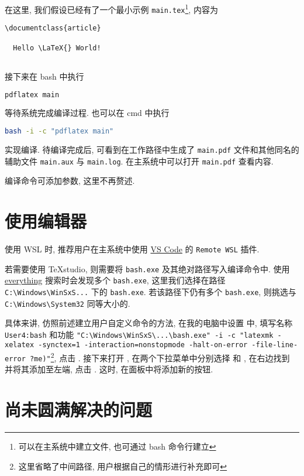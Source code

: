 在这里, 我们假设已经有了一个最小示例 \texttt{main.tex}\footnote{可以在主系统中建立文件, 也可通过 \textsf{bash} 命令行建立},
内容为
\begin{lstlisting}[language = {[LaTeX]TeX}]
  \documentclass{article}
  
  Hello \LaTeX{} World!
  
\end{lstlisting}
接下来在 \textsf{bash} 中执行
\begin{lstlisting}[language=bash]
  pdflatex main
\end{lstlisting}
等待系统完成编译过程. 
也可以在 \textsf{cmd} 中执行
\begin{lstlisting}[language=bash]
  bash -i -c "pdflatex main"
\end{lstlisting}
实现编译.
待编译完成后, 可看到在工作路径中生成了 \texttt{main.pdf} 文件和其他同名的辅助文件 \texttt{main.aux} 与 \texttt{main.log}.
在主系统中可以打开 \texttt{main.pdf} 查看内容.

编译命令可添加参数, 这里不再赘述.

\section{使用编辑器}

使用 WSL 时,
推荐用户在主系统中使用 \href{https://code.visualstudio.com/}{VS Code} 的 \texttt{Remote WSL} 插件.

若需要使用 \TeX studio, 则需要将 \texttt{bash.exe} 及其绝对路径写入编译命令中.
使用 \href{https://www.voidtools.com/zh-cn/}{everything} 搜索时会发现多个 \texttt{bash.exe}, 这里我们选择在路径 \texttt{C:\textbackslash Windows\textbackslash WinSxS...} 下的 \texttt{bash.exe}.
若该路径下仍有多个 \texttt{bash.exe}, 则挑选与 \texttt{C:\textbackslash Windows\textbackslash System32} 同等大小的.

具体来讲, 仿照前述建立用户自定义命令的方法,
在我的电脑中设置  中, 填写名称 \texttt{User4:bash} 和功能 \texttt{"C:\textbackslash Windows\textbackslash WinSxS\textbackslash...\textbackslash bash.exe" -i -c "latexmk -xelatex -synctex=1 -interaction=nonstopmode -halt-on-error -file-line-error ?me)"}\footnote{这里省略了中间路径, 用户根据自己的情形进行补充即可}, 点击 . 
接下来打开 , 在两个下拉菜单中分别选择  和 , 在右边找到  并将其添加至左端, 点击 . 
这时, 在面板中将添加新的按钮. 

\section{尚未圆满解决的问题}

